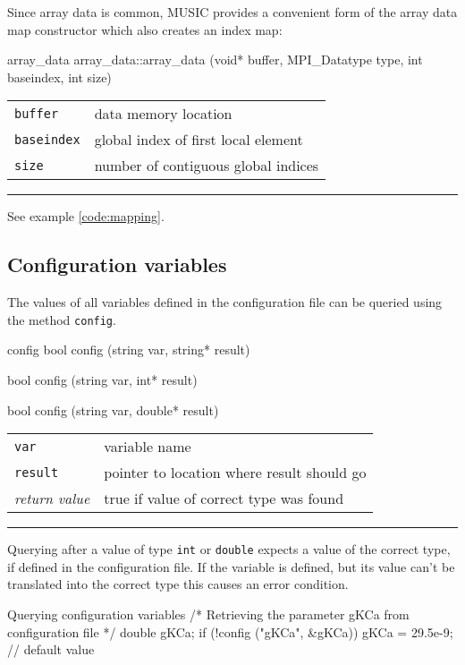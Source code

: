\documentclass[a4paper]{report}
\makeatletter
\newenvironment{parameters}%
{\begin{tabular}{@{\hspace{2em}}lp{0.6\textwidth}}}%
{\end{tabular}\par\vspace{1mm}\par\hrule\par\vspace{5mm}}
\makeatother
\begin{document}
Since array data is common, MUSIC provides a convenient form of the
array data map constructor which also creates an index map:

\begin{head}{array_data}
  array_data::array_data (void* buffer,
                          MPI_Datatype type,
                          int  baseindex,
                          int size)
\end{head}
\begin{parameters}
  \lstinline|buffer|    & data memory location \\
  \lstinline|baseindex| & global index of first local element \\
  \lstinline|size|      & number of contiguous global indices \\
\end{parameters}

See example \ref{code:mapping}.

\pagebreak
\subsection{Configuration variables}

The values of all variables defined in the configuration file can be
queried using the method \lstinline|config|.

\begin{head}{config}
  bool config (string var, string* result)

  bool config (string var, int* result)

  bool config (string var, double* result)
\end{head}
\begin{parameters}
  \lstinline|var|     & variable name \\
  \lstinline|result|  & pointer to location where result should go \\
  \emph{return value} & true if value of correct type was found \\
\end{parameters}

Querying after a value of type \lstinline|int| or \lstinline|double|
expects a value of the correct type, if defined in the configuration
file.  If the variable is defined, but its value can't be translated
into the correct type this causes an error condition.

\begin{code}{Querying configuration variables}
/* Retrieving the parameter gKCa
   from configuration file */
double gKCa;
if (!config ("gKCa", &gKCa))
  gKCa = 29.5e-9; // default value
\end{code}
\end{document}
